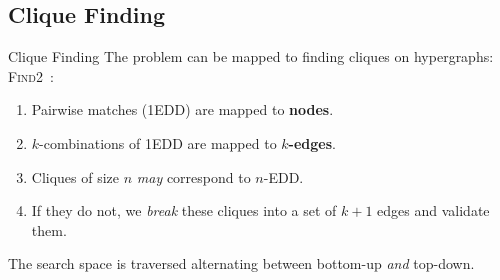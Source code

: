 \documentclass[10pt,notes]{beamer}
\begin{document}
\subsection{Clique Finding}
\begin{frame}{Clique Finding}
    The problem can be mapped to finding cliques on hypergraphs: \textsc{Find2}~\cite{koeller2003discovery}:
    
    \begin{enumerate}
        \item Pairwise matches (1EDD) are mapped to \textbf{nodes}.
        \item $k$-combinations of 1EDD are mapped to \textbf{$k$-edges}.
        \item Cliques of size $n$ \emph{may} correspond to $n$-EDD.
        \item If they do not, we \emph{break} these cliques into a set of $k+1$ edges and
            validate them.
    \end{enumerate}

    The search space is traversed alternating between bottom-up \emph{and} top-down.

\end{frame}
\end{document}
